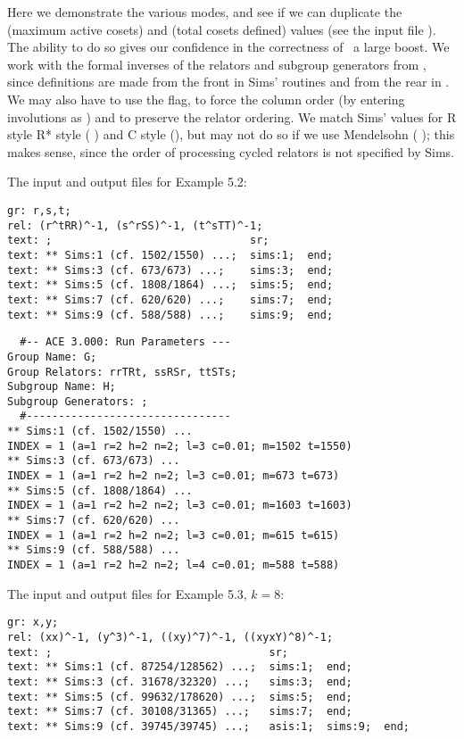 
Here we demonstrate the various  modes, and see if we can
  duplicate the  (maximum active cosets) and  (total cosets
  defined) values (see the input file ).
The ability to do so gives our confidence in the correctness of \ace\ a
  large boost.
We work with the formal inverses of the relators and subgroup generators
  from \cite{Sim}, since definitions are made from the front in Sims'
  routines and from the rear in \ace.
We may also have to use the  flag, to force the column order (by
  entering involutions as ) and to preserve the relator ordering.
We match Sims' values for R style \amp R* style ( \amp 
  ) and C style (), but may not do so if we use
  Mendelsohn ( \amp {}); this makes sense, since the
  order of processing cycled relators is not specified by Sims.

The input and output files for Example 5.2:

\bv\begin{verbatim}
gr: r,s,t;
rel: (r^tRR)^-1, (s^rSS)^-1, (t^sTT)^-1;
text: ;                               sr;
text: ** Sims:1 (cf. 1502/1550) ...;  sims:1;  end;
text: ** Sims:3 (cf. 673/673) ...;    sims:3;  end;
text: ** Sims:5 (cf. 1808/1864) ...;  sims:5;  end;
text: ** Sims:7 (cf. 620/620) ...;    sims:7;  end;
text: ** Sims:9 (cf. 588/588) ...;    sims:9;  end;
\end{verbatim}\ev

\bv\begin{verbatim}
  #-- ACE 3.000: Run Parameters ---
Group Name: G;
Group Relators: rrTRt, ssRSr, ttSTs;
Subgroup Name: H;
Subgroup Generators: ;
  #--------------------------------
** Sims:1 (cf. 1502/1550) ...
INDEX = 1 (a=1 r=2 h=2 n=2; l=3 c=0.01; m=1502 t=1550)
** Sims:3 (cf. 673/673) ...
INDEX = 1 (a=1 r=2 h=2 n=2; l=3 c=0.01; m=673 t=673)
** Sims:5 (cf. 1808/1864) ...
INDEX = 1 (a=1 r=2 h=2 n=2; l=3 c=0.01; m=1603 t=1603)
** Sims:7 (cf. 620/620) ...
INDEX = 1 (a=1 r=2 h=2 n=2; l=3 c=0.01; m=615 t=615)
** Sims:9 (cf. 588/588) ...
INDEX = 1 (a=1 r=2 h=2 n=2; l=4 c=0.01; m=588 t=588)
\end{verbatim}\ev

The input and output files for Example 5.3, $k=8$:

\bv\begin{verbatim}
gr: x,y;
rel: (xx)^-1, (y^3)^-1, ((xy)^7)^-1, ((xyxY)^8)^-1;
text: ;                                  sr;
text: ** Sims:1 (cf. 87254/128562) ...;  sims:1;  end;
text: ** Sims:3 (cf. 31678/32320) ...;   sims:3;  end;
text: ** Sims:5 (cf. 99632/178620) ...;  sims:5;  end;
text: ** Sims:7 (cf. 30108/31365) ...;   sims:7;  end;
text: ** Sims:9 (cf. 39745/39745) ...;   asis:1;  sims:9;  end;
\end{verbatim}\ev


